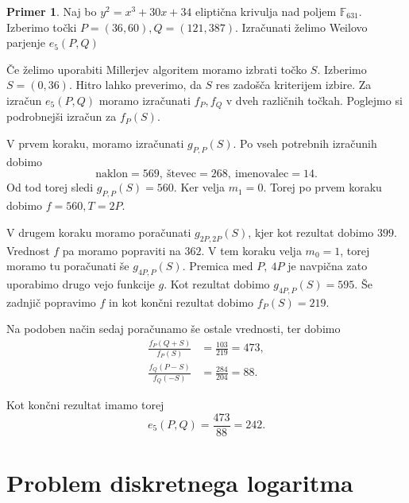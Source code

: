 \documentclass[12pt,a4paper,twoside]{article}
\theoremstyle{definition} %
\newtheorem{primer}[definicija]{Primer}
\theoremstyle{plain} %
\numberwithin{equation}{section}  %
\newcommand{\F}{\mathbb F}
\begin{document}
\begin{primer}
Naj bo $y^2 = x^3+30x+34$ eliptična krivulja nad poljem $\F_{631}$. Izberimo točki $P = (36,60),Q = (121,387)$. Izračunati želimo Weilovo parjenje $e_5(P,Q)$

Če želimo uporabiti Millerjev algoritem moramo izbrati točko $S$. Izberimo $S=(0,36)$. Hitro lahko preverimo, da $S$ res zadošča kriterijem izbire.
Za izračun $e_5(P,Q)$ moramo izračunati $f_P,f_Q$ v dveh različnih točkah. Poglejmo si podrobnejši izračun za $f_P(S)$.

V prvem koraku, moramo izračunati $g_{P,P}(S)$. Po vseh potrebnih izračunih dobimo $$\text{naklon} = 569,\ \text{števec} = 268,\ \text{imenovalec} = 14.$$ Od tod torej sledi $g_{P,P}(S) = 560$. Ker velja $m_1 = 0$. Torej po prvem koraku dobimo $f = 560, T = 2P$.

V drugem koraku moramo poračunati $g_{2P,2P}(S)$, kjer kot rezultat dobimo $399$. Vrednost $f$ pa moramo popraviti na $362$. V tem koraku velja $m_0 = 1$, torej moramo tu poračunati še
$g_{4P,P}(S)$. Premica med $P,\ 4P$ je navpična zato uporabimo drugo vejo funkcije $g$. Kot rezultat dobimo $g_{4P,P}(S) = 595$. Še zadnjič popravimo $f$ in kot končni rezultat dobimo
$f_P(S) = 219$.

Na podoben način sedaj poračunamo še ostale vrednosti, ter dobimo
\begin{align}
\frac{f_P(Q+S)}{f_P(S)} &{}= \frac{103}{219} = 473, \nonumber \\
\frac{f_Q(P-S)}{f_Q(-S)} &{}= \frac{284}{204} = 88. \nonumber
\end{align}

Kot končni rezultat imamo torej
$$e_5(P,Q) =\frac{473}{88} = 242.$$

\end{primer}



\newpage

\section{Problem diskretnega logaritma}
\end{document}
